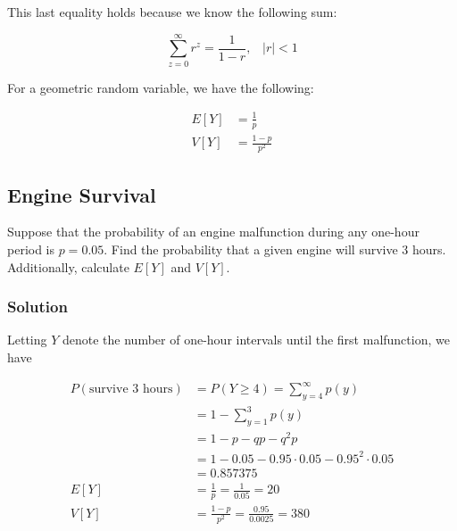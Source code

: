 \documentclass[11pt]{article}
\theoremstyle{definition}
\begin{document}
This last equality holds because we know the following sum:

$$
	\sum_{z=0}^\infty r^z = \frac{1}{1-r}, \;\;\; |r| < 1
$$

For a geometric random variable, we have the following:

$$
	\begin{aligned}
		E[Y] & = \frac{1}{p} \\
		V[Y] & = \frac{1-p}{p^2}
	\end{aligned}
$$

\subsection{Engine Survival}

Suppose that the probability of an engine malfunction during any one-hour period is $p=0.05$. Find the probability that a given engine will survive 3 hours. Additionally, calculate $E[Y]$ and $V[Y]$.

\subsubsection*{Solution}

Letting $Y$ denote the number of one-hour intervals until the first malfunction, we have

$$
	\begin{aligned}
		P(\text{survive 3 hours}) & = P(Y \geq 4) = \sum_{y=4}^\infty p(y) \\
		& = 1 - \sum_{y=1}^3 p(y) \\
		& = 1 - p - qp - q^2p \\
		& = 1 - 0.05 - 0.95 \cdot 0.05 - 0.95^2 \cdot 0.05 \\
		& = 0.857375 \\
		E[Y] & = \frac{1}{p} = \frac{1}{0.05} = 20 \\
		V[Y] & = \frac{1-p}{p^2} = \frac{0.95}{0.0025} = 380
	\end{aligned}
$$
\end{document}

